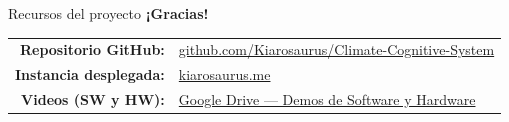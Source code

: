 \documentclass[aspectratio=169,11pt]{beamer}
\begin{document}
\begin{frame}[plain]{Recursos del proyecto}
  \vfill
  \centering
  {\Large\textbf{\color{ccsdark}¡Gracias!}}\\[1.2cm]

  \begin{tabular}{rl}
    \textbf{Repositorio GitHub:} &
      \href{https://github.com/Kiarosaurus/Climate-Cognitive-System}{\color{ccsblue}github.com/Kiarosaurus/Climate-Cognitive-System} \\[6pt]
    \textbf{Instancia desplegada:} &
      \href{https://kiarosaurus.me}{\color{ccsblue}kiarosaurus.me} \\[6pt]
    \textbf{Videos (SW y HW):} &
      \href{https://drive.google.com/drive/folders/1n6j4DU4aDTeXRAdlSHInQun2IR3O-uuh?usp=sharing}{\color{ccsblue}Google Drive --- Demos de Software y Hardware} \\
  \end{tabular}
  \vfill
\end{frame}
\end{document}
